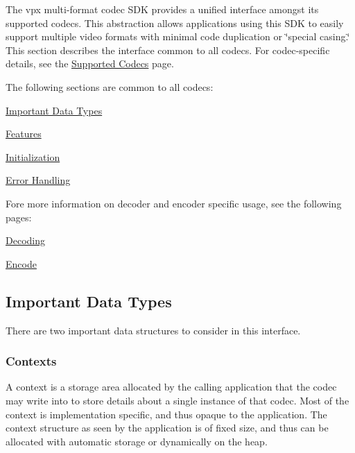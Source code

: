 The vpx multi-\/format codec S\+D\+K provides a unified interface amongst its supported codecs. This abstraction allows applications using this S\+D\+K to easily support multiple video formats with minimal code duplication or \char`\"{}special casing.\char`\"{} This section describes the interface common to all codecs. For codec-\/specific details, see the \hyperlink{group__codecs}{Supported Codecs} page.

The following sections are common to all codecs\+:
\begin{DoxyItemize}
\item \hyperlink{usage_usage_types}{Important Data Types}
\item \hyperlink{usage_usage_features}{Features}
\item \hyperlink{usage_usage_init}{Initialization}
\item \hyperlink{usage_usage_errors}{Error Handling}
\end{DoxyItemize}

Fore more information on decoder and encoder specific usage, see the following pages\+:
\begin{DoxyItemize}
\item \hyperlink{usage_decode}{Decoding}
\begin{DoxyItemize}
\item \hyperlink{usage_encode}{Encode}
\end{DoxyItemize}
\end{DoxyItemize}\hypertarget{usage_usage_types}{}\subsection{Important Data Types}\label{usage_usage_types}
There are two important data structures to consider in this interface.\hypertarget{usage_usage_ctxs}{}\subsubsection{Contexts}\label{usage_usage_ctxs}
A context is a storage area allocated by the calling application that the codec may write into to store details about a single instance of that codec. Most of the context is implementation specific, and thus opaque to the application. The context structure as seen by the application is of fixed size, and thus can be allocated with automatic storage or dynamically on the heap.

